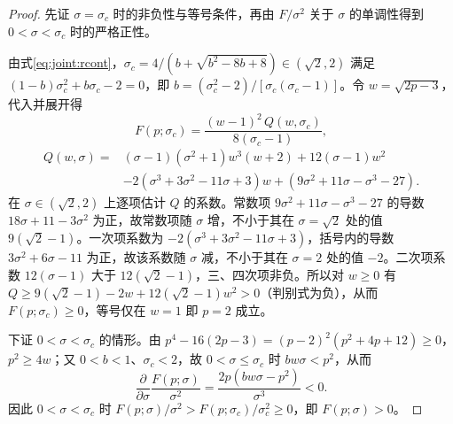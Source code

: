 \begin{proof}
先证 $\sigma=\sigma_c$ 时的非负性与等号条件，再由 $F/\sigma^2$ 关于 $\sigma$ 的单调性得到 $0<\sigma<\sigma_c$ 时的严格正性。

由式\eqref{eq:joint:rcont}，$\sigma_c=4/(b+\sqrt{b^2-8b+8})\in(\sqrt2,2)$ 满足 $(1-b)\sigma_c^2+b\sigma_c-2=0$，即 $b=(\sigma_c^2-2)/[\sigma_c(\sigma_c-1)]$。令 $w=\sqrt{2p-3}$，代入并展开得
\[
F(p;\sigma_c)=\frac{(w-1)^2\,Q(w,\sigma_c)}{8(\sigma_c-1)},
\]
\[
\begin{split}
Q(w,\sigma)={}&(\sigma-1)(\sigma^2+1)w^3(w+2)+12(\sigma-1)w^2\\
&-2(\sigma^3+3\sigma^2-11\sigma+3)w+(9\sigma^2+11\sigma-\sigma^3-27).
\end{split}
\]
在 $\sigma\in(\sqrt2,2)$ 上逐项估计 $Q$ 的系数。常数项 $9\sigma^2+11\sigma-\sigma^3-27$ 的导数 $18\sigma+11-3\sigma^2$ 为正，故常数项随 $\sigma$ 增，不小于其在 $\sigma=\sqrt2$ 处的值 $9(\sqrt2-1)$。一次项系数为 $-2(\sigma^3+3\sigma^2-11\sigma+3)$，括号内的导数 $3\sigma^2+6\sigma-11$ 为正，故该系数随 $\sigma$ 减，不小于其在 $\sigma=2$ 处的值 $-2$。二次项系数 $12(\sigma-1)$ 大于 $12(\sqrt2-1)$，三、四次项非负。所以对 $w\ge0$ 有 $Q\ge9(\sqrt2-1)-2w+12(\sqrt2-1)w^2>0$（判别式为负），从而 $F(p;\sigma_c)\ge0$，等号仅在 $w=1$ 即 $p=2$ 成立。

下证 $0<\sigma<\sigma_c$ 的情形。由 $p^4-16(2p-3)=(p-2)^2(p^2+4p+12)\ge0$，$p^2\ge4w$；又 $0<b<1$、$\sigma_c<2$，故 $0<\sigma\le\sigma_c$ 时 $bw\sigma<p^2$，从而
\[
\frac{\partial}{\partial\sigma}\frac{F(p;\sigma)}{\sigma^2}
=\frac{2p(bw\sigma-p^2)}{\sigma^3}<0.
\]
因此 $0<\sigma<\sigma_c$ 时 $F(p;\sigma)/\sigma^2>F(p;\sigma_c)/\sigma_c^2\ge0$，即 $F(p;\sigma)>0$。
\end{proof}

